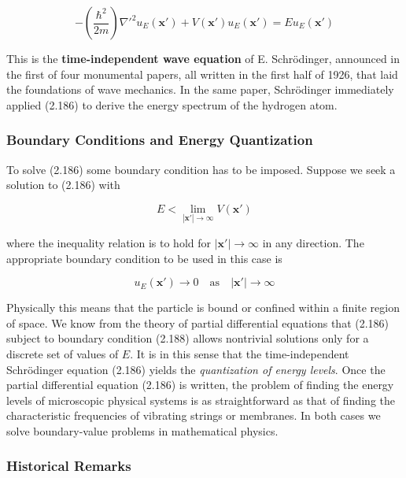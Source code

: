 \documentclass[11pt,a4paper]{article}
\begin{document}
\begin{equation}
\boxed{-\left(\frac{\hbar^2}{2m}\right)\nabla'^2 u_E(\mathbf{x}') + V(\mathbf{x}')u_E(\mathbf{x}') = E u_E(\mathbf{x}')}
\tag{2.186}
\end{equation}

This is the \textbf{time-independent wave equation} of E. Schrödinger, announced in the first of four monumental papers, all written in the first half of 1926, that laid the foundations of wave mechanics. In the same paper, Schrödinger immediately applied (2.186) to derive the energy spectrum of the hydrogen atom.

\subsubsection{Boundary Conditions and Energy Quantization}

To solve (2.186) some boundary condition has to be imposed. Suppose we seek a solution to (2.186) with

\begin{equation}
E < \lim_{|\mathbf{x}'| \to \infty} V(\mathbf{x}')
\tag{2.187}
\end{equation}

where the inequality relation is to hold for $|\mathbf{x}'| \to \infty$ in any direction. The appropriate boundary condition to be used in this case is

\begin{equation}
\boxed{u_E(\mathbf{x}') \to 0 \quad \text{as} \quad |\mathbf{x}'| \to \infty}
\tag{2.188}
\end{equation}

Physically this means that the particle is bound or confined within a finite region of space. We know from the theory of partial differential equations that (2.186) subject to boundary condition (2.188) allows nontrivial solutions only for a discrete set of values of $E$. It is in this sense that the time-independent Schrödinger equation (2.186) yields the \textit{quantization of energy levels}. Once the partial differential equation (2.186) is written, the problem of finding the energy levels of microscopic physical systems is as straightforward as that of finding the characteristic frequencies of vibrating strings or membranes. In both cases we solve boundary-value problems in mathematical physics.

\subsubsection{Historical Remarks}
\end{document}
